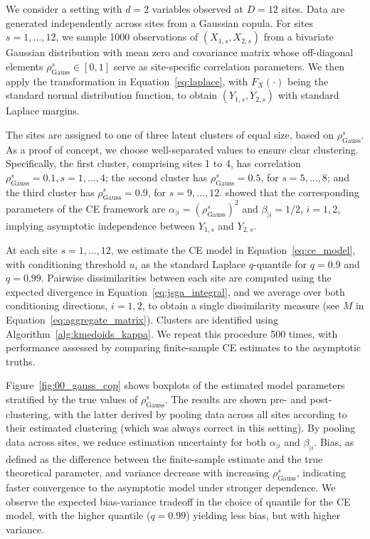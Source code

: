 \documentclass[12pt,compact]{article}
\begin{document}
We consider a setting with $d=2$ variables observed at $D=12$ sites. 
Data are generated independently across sites from a Gaussian copula. 
For sites $s = {1, \ldots, 12}$, we sample 1000 observations of $(X_{1,s}, X_{2,s})$ from a bivariate Gaussian distribution with mean zero and covariance matrix whose off-diagonal elements $\rho^s_{\text{Gauss}} \in [0, 1]$ serve as site-specific correlation parameters.
We then apply the transformation in Equation~\eqref{eq:laplace}, with $F_X(\cdot)$ being the standard normal distribution function, to obtain $(Y_{1,s}, Y_{2,s})$ with standard Laplace margins.

The sites are assigned to one of three latent clusters of equal size, based on $\rho^s_{\text{Gauss}}$.
As a proof of concept, we choose well-separated values to ensure clear clustering.
Specifically, the first cluster, comprising sites 1 to 4, has correlation $\rho_{\text{Gauss}}^s=0.1, s = 1, \ldots, 4$; the second cluster has $\rho_{\text{Gauss}}^s=0.5$, for $s = 5, \ldots, 8$; and the third cluster has $\rho_{\text{Gauss}}^s=0.9$, for $s = 9, \ldots, 12$.
\citet{Keef2013} showed that the corresponding parameters of the CE framework are $\alpha_{\mid i} = (\rho_{\text{Gauss}}^s)^2$ and $\beta_{\mid i} = 1/2$, $i=1,2$, implying asymptotic independence between $Y_{1,s}$ and $Y_{2,s}$.

At each site $s = 1, \ldots, 12$, we estimate the CE model in Equation~\eqref{eq:ce_model}, with conditioning threshold $u_{i}$ as the standard Laplace $q$-quantile for \(q=0.9\) and \(q=0.99\).
Pairwise dissimilarities between each site are computed using the expected divergence in Equation~\eqref{eq:jsga_integral}, and we average over both conditioning directions, $i = 1, 2$, to obtain a single dissimilarity measure (see $M$ in Equation~\eqref{eq:aggregate_matrix}).
Clusters are identified using Algorithm~\ref{alg:kmedoids_kappa}.
We repeat this procedure 500 times, with performance assessed by comparing finite-sample CE estimates to the asymptotic truths. 

Figure~\ref{fig:00_gauss_cop} shows boxplots of the estimated model parameters stratified by the true values of $\rho_{\text{Gauss}}^s$.
The results are shown pre- and post-clustering, with the latter derived by pooling data across all sites according to their estimated clustering (which was always correct in this setting).
By pooling data across sites, we reduce estimation uncertainty for both $\alpha_{\mid i}$ and $\beta_{\mid i}$.
Bias, as defined as the difference between the finite-sample estimate and the true theoretical parameter, and variance decrease with increasing $\rho_{\text{Gauss}}^s$, indicating faster convergence to the asymptotic model under stronger dependence. 
We observe the expected bias-variance tradeoff in the choice of quantile for the CE model, with the higher quantile ($q=0.99$) yielding less bias, but with higher variance.
\end{document}
